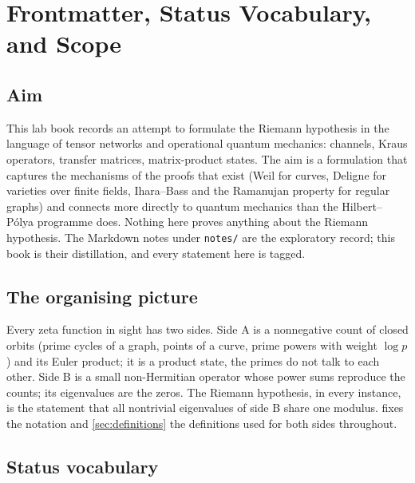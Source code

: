 
\section{Frontmatter, Status Vocabulary, and Scope}

\subsection{Aim}

This lab book records an attempt to formulate the Riemann hypothesis in the
language of tensor networks and operational quantum mechanics: channels, Kraus
operators, transfer matrices, matrix-product states. The aim is a formulation
that captures the mechanisms of the proofs that exist (Weil for curves,
Deligne for varieties over finite fields, Ihara--Bass and the Ramanujan
property for regular graphs) and connects more directly to quantum mechanics
than the Hilbert--P\'olya programme does. Nothing here proves anything about
the Riemann hypothesis. The Markdown notes under \texttt{notes/} are the
exploratory record; this book is their distillation, and every statement here
is tagged.

\subsection{The organising picture}

Every zeta function in sight has two sides. Side A is a nonnegative count of
closed orbits (prime cycles of a graph, points of a curve, prime powers with
weight $\log p$) and its Euler product; it is a product state, the primes do
not talk to each other. Side B is a small non-Hermitian operator whose power
sums reproduce the counts; its eigenvalues are the zeros. The Riemann
hypothesis, in every instance, is the statement that all nontrivial
eigenvalues of side B share one modulus. 
fixes the notation and \cref{sec:definitions} the definitions used for both
sides throughout.

\subsection{Status vocabulary}

